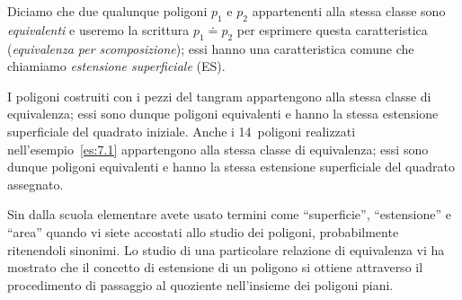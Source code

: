 % 
% 

\begin{definizione}
Diciamo che due qualunque poligoni \(p_1\) e \(p_2\) appartenenti alla 
stessa classe sono \emph{equivalenti} e useremo la scrittura 
\(p_1\doteq p_2\) per esprimere questa caratteristica 
(\emph{equivalenza per scomposizione}); essi hanno una caratteristica 
comune che chiamiamo \emph{estensione superficiale} (ES).
\end{definizione}

I poligoni costruiti con i pezzi del tangram appartengono alla stessa 
classe di equivalenza; essi sono dunque poligoni equivalenti e hanno 
la stessa estensione superficiale del quadrato iniziale.
Anche i 14~poligoni realizzati nell'esempio~\ref{es:7.1} appartengono 
alla stessa classe di equivalenza; essi sono dunque poligoni 
equivalenti e hanno la stessa estensione superficiale del quadrato 
assegnato.

\osservazione Sin dalla scuola elementare avete usato termini come 
``superficie'', ``estensione'' e ``area'' quando vi siete accostati 
allo studio dei poligoni, probabilmente ritenendoli sinonimi. Lo 
studio di una particolare relazione di equivalenza vi ha mostrato che 
il concetto di estensione di un poligono si ottiene attraverso il 
procedimento di passaggio al quoziente nell'insieme dei poligoni 
piani.

